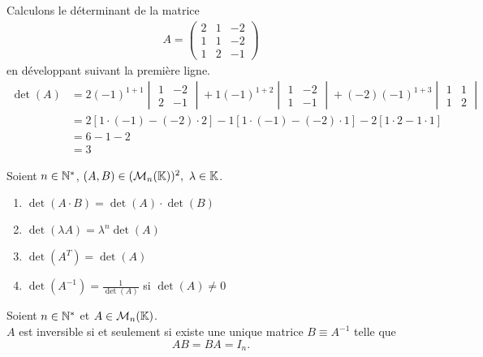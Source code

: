 \begin{example}
	Calculons le déterminant de la matrice 
	\begin{align*}
		A = 
		\begin{pmatrix}
		2 & 1 & -2 \\
		1 & 1 & -2 \\
		1 & 2 & -1
		\end{pmatrix}
	\end{align*}
	en développant suivant la première ligne.
	\begin{align*}
		\det(A) &= 2 (-1)^{1+1} 
		\begin{vmatrix}
			1 & -2 \\
			2 & -1	
		\end{vmatrix}			
		+ 1 (-1)^{1 + 2}
		\begin{vmatrix}
			1 & -2 \\
			1 & -1
		\end{vmatrix}
		+ (-2) (-1)^{1 + 3}
		\begin{vmatrix}
			1 & 1 \\
			1 & 2
		\end{vmatrix}
		\\
		&=
		2[1 \cdot (-1) - (-2) \cdot 2] -1[1 \cdot (-1) - (-2) \cdot 1] -2 [1 \cdot 2 - 1 \cdot 1]
		\\
		&= 6 - 1 - 2 \\
		&= 3
	\end{align*}
\end{example}

\begin{proposition}
	Soient $n \in \mathbb{N}^*$, $(A, B) \in (\mathcal{M}_n(\mathbb{K}))^2,\ \lambda \in \mathbb{K}$.
	\begin{multicols}{2}
	    \begin{enumerate}
		\item $\det(A \cdot B) = \det(A) \cdot \det(B)$
		\item $\det(\lambda A) = \lambda^n \det(A)$
		\item $\det(A^T) = \det(A)$
		\item $\det(A^{-1}) = \frac{1}{\det(A)}$ si $\det(A) \neq 0$
	\end{enumerate}
	\end{multicols}
\end{proposition}

\begin{definition}
	Soient $n \in \mathbb{N}^*$ et $A \in \mathcal{M}_n(\mathbb{K})$.
	\\
	$A$ est inversible si et seulement si existe une unique matrice $B \equiv A^{-1}$ telle que 
	\[AB = BA = I_n.\]
\end{definition}

